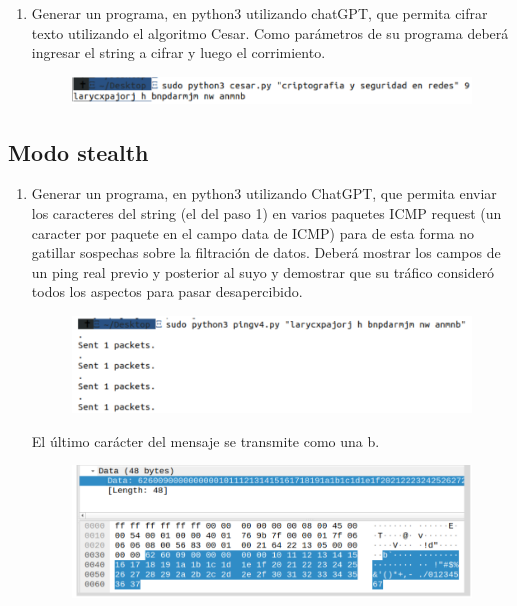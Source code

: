 \documentclass[letter,12pt]{article}
\begin{document}
\begin{enumerate}
\item Generar un programa, en python3 utilizando chatGPT, que permita cifrar texto utilizando el algoritmo Cesar. Como parámetros de su programa deberá ingresar el string a cifrar y luego el corrimiento.
\begin{figure}[H]
        \centering
        \includegraphics[width=15cm]{actividades/A1.png}
        \label{fig:a1}
\end{figure}


\end{enumerate}

\subsection{Modo stealth}

\begin{enumerate}
    \item Generar un programa, en python3 utilizando ChatGPT, que permita enviar los caracteres del string (el del paso 1) en varios paquetes ICMP request (un caracter por paquete en el campo data de ICMP) para de esta forma no gatillar sospechas sobre la filtración de datos.
Deberá mostrar los campos de un ping real previo y posterior al suyo y demostrar que su tráfico consideró todos los aspectos para pasar desapercibido.
    \begin{figure}[H]
        \centering
        \includegraphics[width=15cm]{actividades/A2.1.png}
        \label{fig:a2-1}
    \end{figure}
    El último carácter del mensaje se transmite como una b.
    \begin{figure}[H]
            \centering
            \includegraphics[width=15cm]{actividades/A2.2.png}
            \label{fig:a2-2}
        \end{figure}
\end{enumerate}
\end{document}
